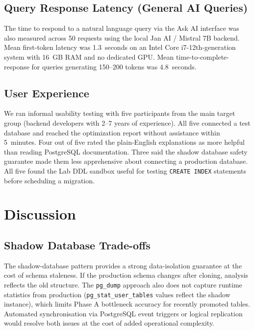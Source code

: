 \documentclass[conference]{IEEEtran}
\begin{document}
\subsection{Query Response Latency (General AI Queries)}

The time to respond to a natural language query via the Ask AI interface
was also measured across 50 requests using the local Jan AI / Mistral 7B
backend. Mean first-token latency was 1.3~seconds on an Intel Core
i7-12th-generation system with 16~GB RAM and no dedicated GPU. Mean
time-to-complete-response for queries generating 150--200 tokens was
4.8~seconds.

\subsection{User Experience}

We ran informal usability testing with five participants from the main
target group (backend developers with 2--7 years of experience). All
five connected a test database and reached the optimization report without
assistance within 5~minutes. Four out of five rated the plain-English
explanations as more helpful than reading PostgreSQL documentation. Three
said the shadow database safety guarantee made them less apprehensive
about connecting a production database. All five found the Lab DDL
sandbox useful for testing \texttt{CREATE INDEX} statements before
scheduling a migration.

\section{Discussion}

\subsection{Shadow Database Trade-offs}

The shadow-database pattern provides a strong data-isolation guarantee at
the cost of schema staleness. If the production schema changes after
cloning, analysis reflects the old structure. The \texttt{pg\_dump}
approach also does not capture runtime statistics from production
(\texttt{pg\_stat\_user\_tables} values reflect the shadow instance),
which limits Phase A bottleneck accuracy for recently promoted tables.
Automated synchronisation via PostgreSQL event triggers or logical
replication would resolve both issues at the cost of added operational
complexity.
\end{document}
